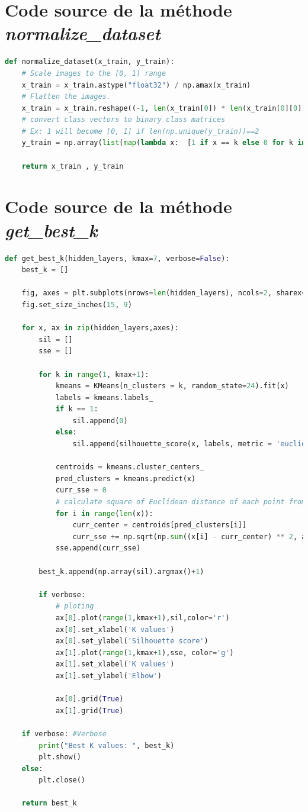 \documentclass[oneside,13pt,a4paper]{report}
\begin{document}
\section{Code source de la méthode \textit{normalize\_dataset}}

\begin{lstlisting}[language=Python]
	def normalize_dataset(x_train, y_train):
    # Scale images to the [0, 1] range
    x_train = x_train.astype("float32") / np.amax(x_train)
    # Flatten the images.
    x_train = x_train.reshape((-1, len(x_train[0]) * len(x_train[0][0])))
    # convert class vectors to binary class matrices
    # Ex: 1 will become [0, 1] if len(np.unique(y_train))==2
    y_train = np.array(list(map(lambda x:  [1 if x == k else 0 for k in np.sort(np.unique(y_train))], y_train)))

    return x_train , y_train
\end{lstlisting}

\section{Code source de la méthode \textit{get\_best\_k}}

\begin{lstlisting}[language=Python]
	def get_best_k(hidden_layers, kmax=7, verbose=False):
    best_k = []

    fig, axes = plt.subplots(nrows=len(hidden_layers), ncols=2, sharex=True)
    fig.set_size_inches(15, 9)

    for x, ax in zip(hidden_layers,axes):
        sil = []
        sse = []

        for k in range(1, kmax+1):
            kmeans = KMeans(n_clusters = k, random_state=24).fit(x)
            labels = kmeans.labels_
            if k == 1:
                sil.append(0)
            else:
                sil.append(silhouette_score(x, labels, metric = 'euclidean'))

            centroids = kmeans.cluster_centers_
            pred_clusters = kmeans.predict(x)
            curr_sse = 0
            # calculate square of Euclidean distance of each point from its cluster center and add to current WSS
            for i in range(len(x)):
                curr_center = centroids[pred_clusters[i]]
                curr_sse += np.sqrt(np.sum((x[i] - curr_center) ** 2, axis=0))
            sse.append(curr_sse)
        
        best_k.append(np.array(sil).argmax()+1)
        
        if verbose:
            # ploting
            ax[0].plot(range(1,kmax+1),sil,color='r')
            ax[0].set_xlabel('K values')
            ax[0].set_ylabel('Silhouette score')
            ax[1].plot(range(1,kmax+1),sse, color='g')
            ax[1].set_xlabel('K values')
            ax[1].set_ylabel('Elbow')
            
            ax[0].grid(True)
            ax[1].grid(True)
        
    if verbose: #Verbose
        print("Best K values: ", best_k)
        plt.show()
    else:
        plt.close()
    
    return best_k
\end{lstlisting}
\end{document}
